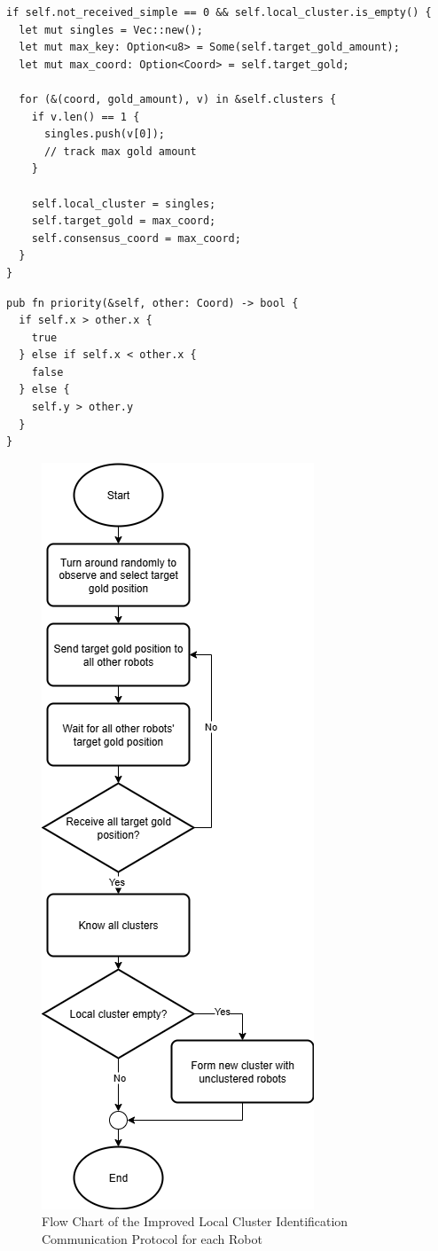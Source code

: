 \documentclass[12pt,a4paper]{article}
\begin{document}
\begin{lstlisting}[float, caption={Robots without a cluster forming a new group}, label={lst:singles}]
if self.not_received_simple == 0 && self.local_cluster.is_empty() {
  let mut singles = Vec::new();
  let mut max_key: Option<u8> = Some(self.target_gold_amount);
  let mut max_coord: Option<Coord> = self.target_gold;

  for (&(coord, gold_amount), v) in &self.clusters {
    if v.len() == 1 {
      singles.push(v[0]);
      // track max gold amount
    }

    self.local_cluster = singles;
    self.target_gold = max_coord;
    self.consensus_coord = max_coord;
  }
}
\end{lstlisting}

\begin{lstlisting}[float, caption={Rule for breaking ties between coordinates with same gold amount}, label={lst:tie-break}]
pub fn priority(&self, other: Coord) -> bool {
  if self.x > other.x {
    true
  } else if self.x < other.x {
    false
  } else {
    self.y > other.y
  }
}
\end{lstlisting}

\begin{figure}
    \centering
    \includegraphics[width=0.5\linewidth]{images/improved_cluster_flow.png}
    \caption{Flow Chart of the Improved Local Cluster Identification Communication Protocol for each Robot}   
    \label{fig:cluster-flowchart}
\end{figure}
\end{document}
